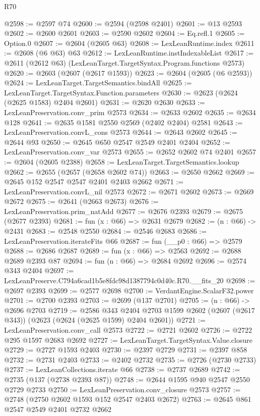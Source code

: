 \begin{lexlean}{R70}
\begin{coremodule}
@2598 := @2597 @74
@2600 := @2594 (@2598 @2401)
@2601 := @13 @2593
@2602 := @2600 @2601
@2603 := @2590 @2602
@2604 := Eq.refl.{1}
@2605 := Option.{0}
@2607 := @2604 (@2605 @63)
@2608 := LexLeanRuntime.index
@2611 := @2608 (@6 @63) @63
@2612 := LexLeanRuntime.instIndexableList
@2617 := @2611 (@2612 @63) (LexLeanTarget.TargetSyntax.Program.functions @2573)
@2620 := @2603 (@2607 (@2617 @1593))
@2623 := @2604 (@2605 (@6 @2593))
@2624 := LexLeanTarget.TargetSemantics.bindAll
@2625 := LexLeanTarget.TargetSyntax.Function.parameters
@2630 := @2623 (@2624 (@2625 @1583) @2404 @2601)
@2631 := @2620 @2630
@2633 := LexLeanPreservation.conv_prim @2573
@2634 := @2633 @2602
@2635 := @2634 @128
@2641 := @2635 @1581 @2550 @2569 (@2402 @2404) @2581
@2643 := LexLeanPreservation.convL_cons @2573
@2644 := @2643 @2602
@2645 := @2644 @93
@2650 := @2645 @650 @2547 @2549 @2401 @2404
@2652 := LexLeanPreservation.conv_var @2573
@2655 := @2652 @2602 @74 @2401
@2657 := @2604 (@2605 @2388)
@2658 := LexLeanTarget.TargetSemantics.lookup
@2662 := @2655 (@2657 (@2658 @2602 @74))
@2663 := @2650 @2662
@2669 := @2645 @152 @2547 @2547 @2401 @2403 @2662
@2671 := LexLeanPreservation.convL_nil @2573
@2672 := @2671 @2602
@2673 := @2669 @2672
@2675 := @2641 (@2663 @2673)
@2676 := LexLeanPreservation.prim_natAdd
@2677 := @2676 @2393
@2679 := @2675 (@2677 @2393)
@2681 := fun (x : @66) => @2631 @2679
@2682 := (n : @66) -> @2431
@2683 := @2548 @2550
@2684 := @2546 @2683
@2686 := LexLeanPreservation.iterateFits @66
@2687 := fun (__p0 : @66) => @2579
@2688 := @2686 @2687
@2689 := fun (x : @66) => @2563
@2692 := @2688 @2689 @2393 @87
@2694 := fun (n : @66) => @2684 @2692
@2696 := @2574 @343 @2404
@2697 := LexLeanPreserve.C794a6cad1b5e8fdc98d1387794c0d40c.R70.__fits_20
@2698 := @2697 @2393
@2699 := @2577 @2698
@2700 := VerdantEngine.ScalarF32.power
@2701 := @2700 @2393
@2703 := @2699 (@137 @2701)
@2705 := (n : @66) -> @2696 @2703
@2719 := @2586
    @343
    @2404
    @2703
    @1599
    @2602
    (@2607 (@2617 @343))
    (@2623 (@2624 (@2625 @1599) @2404 @2601))
@2721 := LexLeanPreservation.conv_call @2573
@2722 := @2721 @2602
@2726 := @2722 @295 @1597 @2683 @2692
@2727 := LexLeanTarget.TargetSyntax.Value.closure
@2729 := @2727 @1593 @2403
@2730 := @2397 @2729
@2731 := @2397 @858
@2732 := @2731 @2403
@2733 := @2402 @2732
@2735 := @2726 (@2730 @2733)
@2737 := LexLeanCollections.iterate @66
@2738 := @2737 @2689
@2742 := @2735 (@137 (@2738 @2393 @87))
@2748 := @2644 @1595 @940 @2547 @2550 @2729 @2733
@2750 := LexLeanPreservation.conv_closure @2573
@2757 := @2748 (@2750 @2602 @1593 @152 @2547 @2403 @2672)
@2763 := @2645 @861 @2547 @2549 @2401 @2732 @2662

\end{coremodule}
\end{lexlean}
